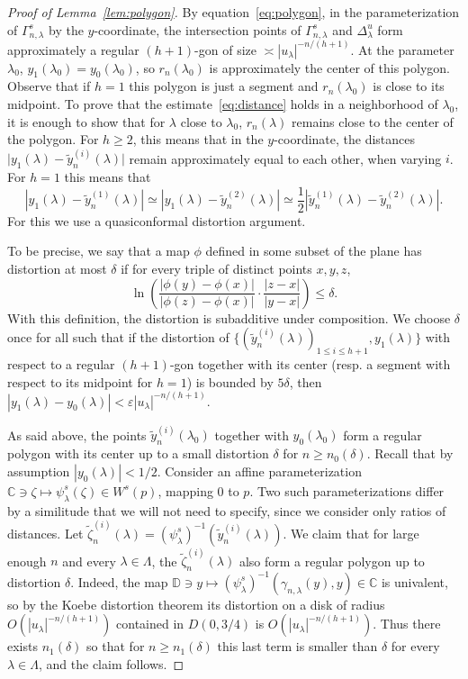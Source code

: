 \documentclass[11pt, oneside]{amsart}
\newcommand{\C}{\mathbb{C}}
\newcommand{\D}{\mathbb{D}}
\newcommand{\e}{\varepsilon}
\newcommand{\abs}[1]{\left\vert#1\right\vert}
\newcommand{\lrpar}[1]{\left(#1\right)}
\newcommand{\la}{\lambda}
\newcommand{\lo}{{\lambda_0}}
\newcommand{\inv}{^{-1}}
\theoremstyle{remark}
\theoremstyle{definition}
\theoremstyle{theorem}
\newcommand{\commentaire}[1]{}
\begin{document}
\begin{proof}[Proof of Lemma~\ref{lem:polygon}]  
By equation~\eqref{eq:polygon}, 
in the parameterization of $\Gamma_{n, \lambda}^s$ by the 
$y$-coordi\-nate, 
the  intersection points of $\Gamma_{n, \lambda}^s$ and $\Delta^u_\lambda$
 form approximately a regular $(h+1)$-gon of size 
$\asymp\abs{u_\la}^{-n/(h+1)}$.  At the parameter 
$\lo$, $y_1(\lo) = y_0(\lo)$, so 
$r_n(\lo)$ is approximately the center of this polygon. Observe that if $h=1$ this polygon 
is just a segment and $r_n(\lo)$ is close to its midpoint. \commentaire{New sentence for Major remark \#2.}
To prove
 that the estimate~\eqref{eq:distance} holds in a neighborhood of $\lo$, 
 it is enough to show that for $\la$ close to $\lo$, 
 $r_n(\la)$ remains close to the center of the polygon. For $h\geq 2$, this means that 
in the $y$-coordinate, the distances $\big|{y_1(\lambda) - \tilde y_n^{(i)}(\lambda)}\big|$ 
remain approximately equal to each other, when  varying $i$. \commentaire{continued}For $h=1$ this means that 
$$\abs{y_1(\lambda) - \tilde y_n^{(1)}(\lambda)}\simeq \abs{y_1(\lambda) - \tilde y_n^{(2)}(\lambda)}
 \simeq \frac12 \abs{\tilde y_n^{(1)}(\lambda)- \tilde y_n^{(2)}(\lambda)}.$$
For this we use a quasiconformal distortion argument. 

To be precise, we say that a map $\phi$ defined in some subset of the plane has distortion at most 
$\delta$ if for every triple of distinct points $x,y,z$, 
\begin{equation}
 \ln\lrpar{ \frac{\abs{\phi(y) - \phi(x)}}{\abs{\phi(z) - \phi(x)}} \cdot \frac{\abs{z - x}}{\abs{y-x}} } \leq \delta.
\end{equation}
With this definition, the distortion is subadditive under composition.  
We choose $\delta$ once for all such that if the distortion of 
$\big\{(\tilde y_n^{(i)}(\la))_{1\leq i\leq h+1}, y_1(\la)\big\}$ with respect to a regular
$(h+1)$-gon together with its center  (\commentaire{continued}resp. a segment with respect to its midpoint for $h=1$)
 is bounded by 
$5\delta$, then $\abs{y_1(\la) - y_0(\la)} < \e \abs{u_\la}^{-n/(h+1)}$.

As said above, 
  the points $\tilde y_n^{(i)}(\lo)$ together with $y_0(\lo)$ 
  form a regular polygon  with its center
  up to a small distortion $\delta$ for $n\geq n_0(\delta)$. Recall that by assumption 
  $\abs{y_0(\la) }<1/2$.
 Consider an  affine parameterization $ \C\ni \zeta \mapsto \psi_\la^s(\zeta)\in W^s(p)$, mapping  0 to $p$. Two such parameterizations differ by a similitude that we will not need to specify, 
 since we consider only ratios of distances. Let 
 $\tilde \zeta_n^{(i)} (\la)  = (\psi_\la^s)\inv(\tilde y_n^{(i)}(\la))$. We claim that  
  for large enough $n$ and every $\la\in \Lambda $, 
 the $\tilde \zeta_n^{(i)}(\la) $ also form a regular polygon up to distortion $\delta$.  Indeed, the map 
 $\D\ni y \mapsto (\psi^s_\la)\inv (\gamma_{n, \la}(y), y) \in \C$ is univalent, so by the Koebe distortion theorem its distortion on a disk of radius $O(\abs{u_\la}^{-n/(h+1)})$ contained  
 in $D(0, 3/4)$ is $O(\abs{u_\la}^{-n/(h+1)})$.  Thus there exists $n_1(\delta)$ so that for 
 $n\geq n_1(\delta)$ this last term is smaller than 
 $\delta$ for every $\la\in \Lambda $, and the claim follows. 
 

\end{proof}
\end{document}
